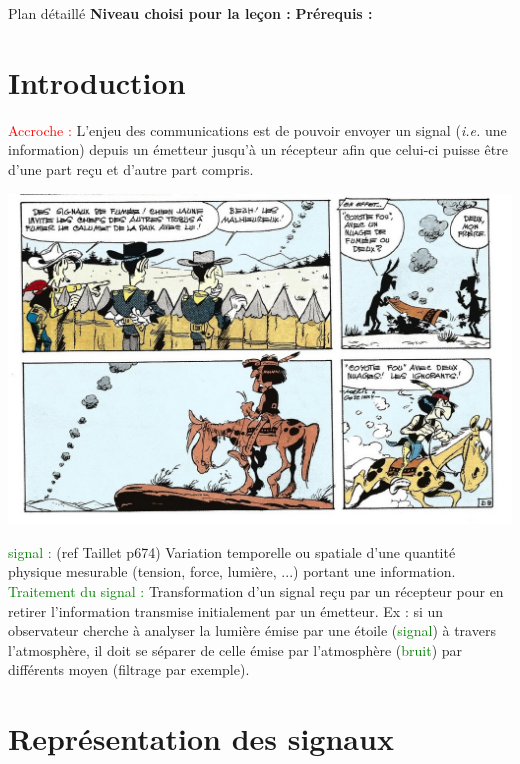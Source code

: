 \begin{reportBlock}{Plan détaillé}
  \textbf{Niveau choisi pour la leçon :} 
  \newline
  \textbf{Prérequis : }
  \newline

\section*{Introduction}
\textcolor{red}{Accroche : }L'enjeu des communications est de pouvoir envoyer un signal (\textit{i.e.} une information) depuis un émetteur jusqu'à un récepteur afin que celui-ci puisse être d'une part reçu et d'autre part compris.
\begin{center}
    \includegraphics[scale=0.8]{LP_TraitementSignal/Codage_LuckyLuke.jpg}
\end{center}
\textcolor{green}{signal :} (ref Taillet p674) Variation temporelle ou spatiale d'une quantité physique mesurable (tension, force, lumière, ...) portant une information.\\
\textcolor{green}{Traitement du signal :} Transformation d'un signal reçu par un récepteur pour en retirer l'information transmise initialement par un émetteur. Ex : si un observateur cherche à analyser la lumière émise par une étoile (\textcolor{green}{signal}) à travers l'atmosphère, il doit se séparer de celle émise par l'atmosphère (\textcolor{green}{bruit}) par différents moyen (filtrage par exemple).

\section{Représentation des signaux}


\end{reportBlock}
